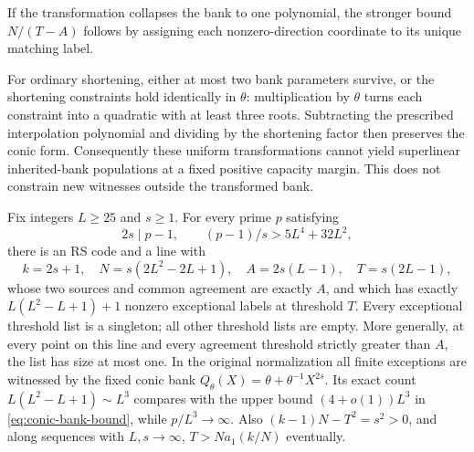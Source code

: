 If the transformation collapses the bank to one polynomial, the stronger
bound $N/(T-A)$ follows by assigning each nonzero-direction coordinate to
its unique matching label.

For ordinary shortening, either at most two bank parameters survive, or
the shortening constraints hold identically in $\theta$: multiplication
by $\theta$ turns each constraint into a quadratic with at least three
roots. Subtracting the prescribed interpolation polynomial and dividing
by the shortening factor then preserves the conic form. Consequently
these uniform transformations cannot yield superlinear inherited-bank
populations at a fixed positive capacity margin. This does not constrain
new witnesses outside the transformed bank.

\begin{proposition}\label{prop:conic-bank-order-sharpness}
Fix integers $L\ge25$ and $s\ge1$. For every prime $p$ satisfying
\[
 2s\mid p-1,\qquad (p-1)/s>5L^4+32L^2,
\]
there is an RS code and a line with
\[
 k=2s+1,\quad N=s(2L^2-2L+1),\quad
 A=2s(L-1),\quad T=s(2L-1),
\]
whose two sources and common agreement are exactly $A$, and which has
exactly $L(L^2-L+1)+1$ nonzero exceptional labels at threshold $T$.
Every exceptional threshold list is a singleton; all other threshold lists
are empty. More generally, at every point on this line and every
agreement threshold strictly greater than $A$, the list has size at most one.
In the original normalization all finite exceptions are witnessed
by the fixed conic bank $Q_\theta(X)=\theta+\theta^{-1}X^{2s}$.
Its exact count $L(L^2-L+1)\sim L^3$ compares with the upper bound
$(4+o(1))L^3$ in \eqref{eq:conic-bank-bound}, while $p/L^3\to\infty$.
Also $(k-1)N-T^2=s^2>0$, and along sequences with $L,s\to\infty$,
$T>N a_1(k/N)$ eventually.
\end{proposition}

